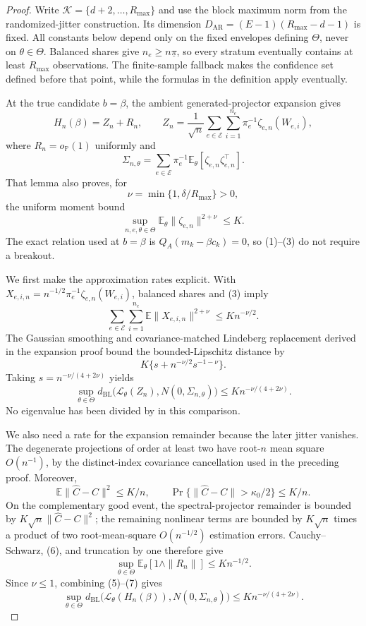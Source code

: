 \documentclass{article}
\begin{document}
\begin{proof}
Write \(\mathcal K=\{d+2,\ldots,R_{\max}\}\) and use the block maximum norm from the randomized-jitter construction.  Its dimension \(D_{\mathrm{AR}}=(E-1)(R_{\max}-d-1)\) is fixed.  All constants below depend only on the fixed envelopes defining \(\Theta\), never on \(\theta\in\Theta\).  Balanced shares give \(n_e\geq n\underline\pi\), so every stratum eventually contains at least \(R_{\max}\) observations.  The finite-sample fallback makes the confidence set defined before that point, while the formulas in the definition apply eventually.

At the true candidate \(b=\beta\), the ambient generated-projector expansion gives
\[
 H_n(\beta)=Z_n+R_n,
 \qquad
 Z_n=\frac1{\sqrt n}\sum_{e\in\mathcal E}\sum_{i=1}^{n_e}
 \pi_e^{-1}\zeta_{e,n}(W_{e,i}), \tag{1}
\]
where \(R_n=o_{\mathbb P}(1)\) uniformly and
\[
 \Sigma_{n,\theta}=\sum_{e\in\mathcal E}\pi_e^{-1}
 \mathbb E_\theta[\zeta_{e,n}\zeta_{e,n}^\top]. \tag{2}
\]
That lemma also proves, for
\[
 \nu=\min\{1,\delta/R_{\max}\}>0,
\]
the uniform moment bound
\[
 \sup_{n,e,\theta\in\Theta}
 \mathbb E_\theta\|\zeta_{e,n}\|^{2+\nu}\leq K. \tag{3}
\]
The exact relation used at \(b=\beta\) is
\(Q_A(m_k-\beta c_k)=0\), so (1)--(3) do not require a breakout.

We first make the approximation rates explicit.  With
\(X_{e,i,n}=n^{-1/2}\pi_e^{-1}\zeta_{e,n}(W_{e,i})\), balanced shares and (3) imply
\[
 \sum_{e\in\mathcal E}\sum_{i=1}^{n_e}
 \mathbb E\|X_{e,i,n}\|^{2+\nu}
 \leq K n^{-\nu/2}. \tag{4}
\]
The Gaussian smoothing and covariance-matched Lindeberg replacement derived in the expansion proof bound the bounded-Lipschitz distance by
\[
 K\{s+n^{-\nu/2}s^{-1-\nu}\}.
\]
Taking \(s=n^{-\nu/(4+2\nu)}\) yields
\[
 \sup_{\theta\in\Theta}
 d_{\mathrm{BL}}\bigl(\mathcal L_\theta(Z_n),
 N(0,\Sigma_{n,\theta})\bigr)
 \leq K n^{-\nu/(4+2\nu)}. \tag{5}
\]
No eigenvalue has been divided by in this comparison.

We also need a rate for the expansion remainder because the later jitter vanishes.  The degenerate projections of order at least two have root-\(n\) mean square \(O(n^{-1})\), by the distinct-index covariance cancellation used in the preceding proof.  Moreover,
\[
 \mathbb E\|\widehat C-C\|^2\leq K/n,
 \qquad
 \Pr\{\|\widehat C-C\|>\kappa_0/2\}\leq K/n. \tag{6}
\]
On the complementary good event, the spectral-projector remainder is bounded by
\(K\sqrt n\|\widehat C-C\|^2\); the remaining nonlinear terms are bounded by \(K\sqrt n\) times a product of two root-mean-square \(O(n^{-1/2})\) estimation errors.  Cauchy--Schwarz, (6), and truncation by one therefore give
\[
 \sup_{\theta\in\Theta}
 \mathbb E_\theta[1\wedge\|R_n\|]
 \leq K n^{-1/2}. \tag{7}
\]
Since \(\nu\leq1\), combining (5)--(7) gives
\[
 \sup_{\theta\in\Theta}
 d_{\mathrm{BL}}\bigl(\mathcal L_\theta(H_n(\beta)),
 N(0,\Sigma_{n,\theta})\bigr)
 \leq K n^{-\nu/(4+2\nu)}. \tag{8}
\]


\end{proof}
\end{document}
